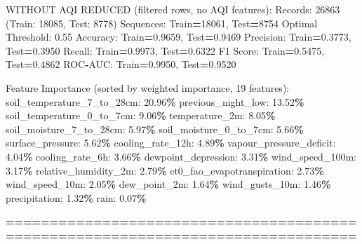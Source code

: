 \documentclass[
  letterpaper,
  DIV=11,
  numbers=noendperiod]{scrartcl}
\newenvironment{Shaded}{\begin{snugshade}}{\end{snugshade}}
\newcommand{\BuiltInTok}[1]{#1}
\newcommand{\DecValTok}[1]{\textcolor[rgb]{0.00,0.00,0.81}{#1}}
\newcommand{\FloatTok}[1]{\textcolor[rgb]{0.00,0.00,0.81}{#1}}
\newcommand{\NormalTok}[1]{#1}
\newcommand{\OperatorTok}[1]{\textcolor[rgb]{0.81,0.36,0.00}{\textbf{#1}}}
\begin{document}
\begin{Shaded}
\begin{Highlighting}[]
\NormalTok{WITHOUT AQI REDUCED (filtered rows, no AQI features):}
\NormalTok{  Records: }\DecValTok{26863}\NormalTok{ (Train: }\DecValTok{18085}\NormalTok{, Test: }\DecValTok{8778}\NormalTok{)}
\NormalTok{  Sequences: Train}\OperatorTok{=}\DecValTok{18061}\NormalTok{, Test}\OperatorTok{=}\DecValTok{8754}
\NormalTok{  Optimal Threshold: }\FloatTok{0.55}
\NormalTok{  Accuracy: Train}\OperatorTok{=}\FloatTok{0.9659}\NormalTok{, Test}\OperatorTok{=}\FloatTok{0.9469}
\NormalTok{  Precision: Train}\OperatorTok{=}\FloatTok{0.3773}\NormalTok{, Test}\OperatorTok{=}\FloatTok{0.3950}
\NormalTok{  Recall: Train}\OperatorTok{=}\FloatTok{0.9973}\NormalTok{, Test}\OperatorTok{=}\FloatTok{0.6322}
\NormalTok{  F1 Score: Train}\OperatorTok{=}\FloatTok{0.5475}\NormalTok{, Test}\OperatorTok{=}\FloatTok{0.4862}
\NormalTok{  ROC}\OperatorTok{{-}}\NormalTok{AUC: Train}\OperatorTok{=}\FloatTok{0.9950}\NormalTok{, Test}\OperatorTok{=}\FloatTok{0.9520}

\NormalTok{  Feature Importance (}\BuiltInTok{sorted}\NormalTok{ by weighted importance, }\DecValTok{19}\NormalTok{ features):}
\NormalTok{    soil\_temperature\_7\_to\_28cm: }\FloatTok{20.96}\OperatorTok{\%}
\NormalTok{    previous\_night\_low: }\FloatTok{13.52}\OperatorTok{\%}
\NormalTok{    soil\_temperature\_0\_to\_7cm: }\FloatTok{9.06}\OperatorTok{\%}
\NormalTok{    temperature\_2m: }\FloatTok{8.05}\OperatorTok{\%}
\NormalTok{    soil\_moisture\_7\_to\_28cm: }\FloatTok{5.97}\OperatorTok{\%}
\NormalTok{    soil\_moisture\_0\_to\_7cm: }\FloatTok{5.66}\OperatorTok{\%}
\NormalTok{    surface\_pressure: }\FloatTok{5.62}\OperatorTok{\%}
\NormalTok{    cooling\_rate\_12h: }\FloatTok{4.89}\OperatorTok{\%}
\NormalTok{    vapour\_pressure\_deficit: }\FloatTok{4.04}\OperatorTok{\%}
\NormalTok{    cooling\_rate\_6h: }\FloatTok{3.66}\OperatorTok{\%}
\NormalTok{    dewpoint\_depression: }\FloatTok{3.31}\OperatorTok{\%}
\NormalTok{    wind\_speed\_100m: }\FloatTok{3.17}\OperatorTok{\%}
\NormalTok{    relative\_humidity\_2m: }\FloatTok{2.79}\OperatorTok{\%}
\NormalTok{    et0\_fao\_evapotranspiration: }\FloatTok{2.73}\OperatorTok{\%}
\NormalTok{    wind\_speed\_10m: }\FloatTok{2.05}\OperatorTok{\%}
\NormalTok{    dew\_point\_2m: }\FloatTok{1.64}\OperatorTok{\%}
\NormalTok{    wind\_gusts\_10m: }\FloatTok{1.46}\OperatorTok{\%}
\NormalTok{    precipitation: }\FloatTok{1.32}\OperatorTok{\%}
\NormalTok{    rain: }\FloatTok{0.07}\OperatorTok{\%}

\OperatorTok{================================================================================}


\end{Highlighting}
\end{Shaded}
\end{document}
